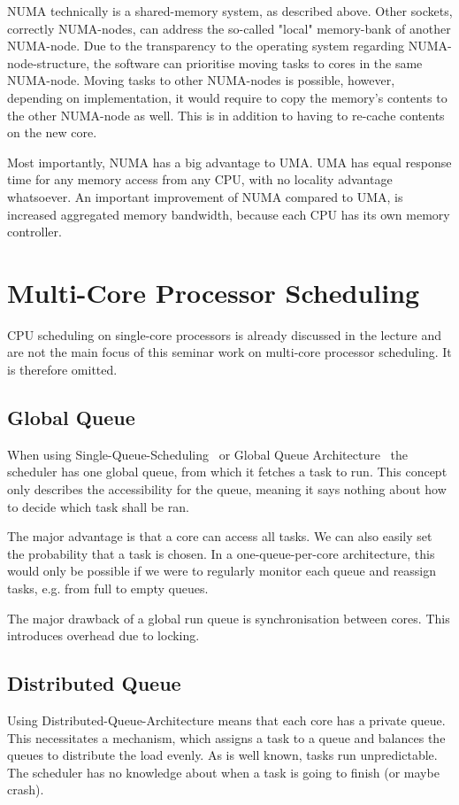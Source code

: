 \documentclass[runningheads]{llncs}
\begin{document}
NUMA technically is a shared-memory system, as described above. Other sockets, correctly NUMA-nodes, can address the so-called "local" memory-bank of another NUMA-node. Due to the transparency to the operating system regarding NUMA-node-structure, the software can prioritise moving tasks to cores in the same NUMA-node. Moving tasks to other NUMA-nodes is possible, however, depending on implementation, it would require to copy the memory's contents to the other NUMA-node as well. This is in addition to having to re-cache contents on the new core.

Most importantly, NUMA has a big advantage to UMA. UMA has equal response time for any memory access from any CPU, with no locality advantage whatsoever. An important improvement of NUMA compared to UMA, is increased aggregated memory bandwidth, because each CPU has its own memory controller.~\cite{hpc-numa-slides}

\section{Multi-Core Processor Scheduling}
CPU scheduling on single-core processors is already discussed in the lecture and are not the main focus of this seminar work on multi-core processor scheduling. It is therefore omitted.

\subsection{Global Queue}
When using Single-Queue-Scheduling~\cite{ostep} or Global Queue Architecture~\cite{meehean} the scheduler has one global queue, from which it fetches a task to run. This concept only describes the accessibility for the queue, meaning it says nothing about how to decide which task shall be ran.

The major advantage is that a core can access all tasks. We can also easily set the probability that a task is chosen. In a one-queue-per-core architecture, this would only be possible if we were to regularly monitor each queue and reassign tasks, e.g. from full to empty queues.

The major drawback of a global run queue is synchronisation between cores. This introduces overhead due to locking.~\cite{meehean}

\subsection{Distributed Queue}
Using Distributed-Queue-Architecture means that each core has a private queue. This necessitates a mechanism, which assigns a task to a queue and balances the queues to distribute the load evenly. As is well known, tasks run unpredictable. The scheduler has no knowledge about when a task is going to finish (or maybe crash). 
\end{document}
